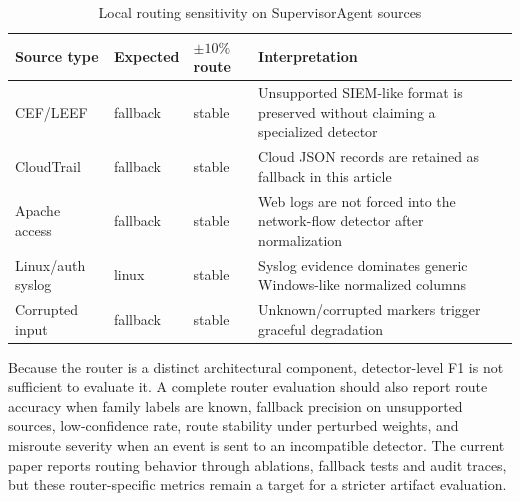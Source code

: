 \documentclass[conference]{IEEEtran}
\begin{document}
\begin{table}[t]
\caption{Local routing sensitivity on SupervisorAgent sources}
\label{tab:router_sensitivity}
\centering
\scriptsize
\begin{tabularx}{\linewidth}{p{2.4cm}p{1.5cm}p{1.5cm}X}
\toprule
\textbf{Source type} & \textbf{Expected} & \textbf{$\pm10\%$ route} & \textbf{Interpretation} \\
\midrule
CEF/LEEF & fallback & stable & Unsupported SIEM-like format is preserved without claiming a specialized detector \\
CloudTrail & fallback & stable & Cloud JSON records are retained as fallback in this article \\
Apache access & fallback & stable & Web logs are not forced into the network-flow detector after normalization \\
Linux/auth syslog & linux & stable & Syslog evidence dominates generic Windows-like normalized columns \\
Corrupted input & fallback & stable & Unknown/corrupted markers trigger graceful degradation \\
\bottomrule
\end{tabularx}
\end{table}

Because the router is a distinct architectural component, detector-level F1 is not sufficient to evaluate it. A complete router evaluation should also report route accuracy when family labels are known, fallback precision on unsupported sources, low-confidence rate, route stability under perturbed weights, and misroute severity when an event is sent to an incompatible detector. The current paper reports routing behavior through ablations, fallback tests and audit traces, but these router-specific metrics remain a target for a stricter artifact evaluation.
\end{document}
